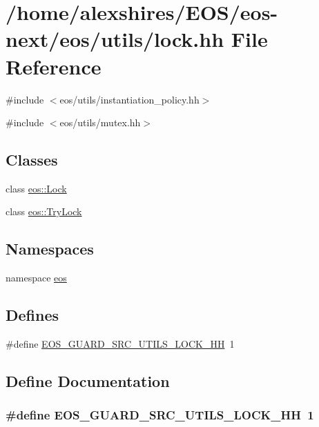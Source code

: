 \hypertarget{lock_8hh}{
\section{/home/alexshires/EOS/eos-\/next/eos/utils/lock.hh File Reference}
\label{lock_8hh}
}
{\ttfamily \#include $<$eos/utils/instantiation\_\-policy.hh$>$}\par
{\ttfamily \#include $<$eos/utils/mutex.hh$>$}\par
\subsection*{Classes}
\begin{DoxyCompactItemize}
\item 
class \hyperlink{classeos_1_1Lock}{eos::Lock}
\item 
class \hyperlink{classeos_1_1TryLock}{eos::TryLock}
\end{DoxyCompactItemize}
\subsection*{Namespaces}
\begin{DoxyCompactItemize}
\item 
namespace \hyperlink{namespaceeos}{eos}
\end{DoxyCompactItemize}
\subsection*{Defines}
\begin{DoxyCompactItemize}
\item 
\#define \hyperlink{lock_8hh_ae5f61308189b80dc261a32a2dc110b6a}{EOS\_\-GUARD\_\-SRC\_\-UTILS\_\-LOCK\_\-HH}~1
\end{DoxyCompactItemize}


\subsection{Define Documentation}
\hypertarget{lock_8hh_ae5f61308189b80dc261a32a2dc110b6a}{
\subsubsection[{EOS\_\-GUARD\_\-SRC\_\-UTILS\_\-LOCK\_\-HH}]{\setlength{\rightskip}{0pt plus 5cm}\#define EOS\_\-GUARD\_\-SRC\_\-UTILS\_\-LOCK\_\-HH~1}}
\label{lock_8hh_ae5f61308189b80dc261a32a2dc110b6a}
